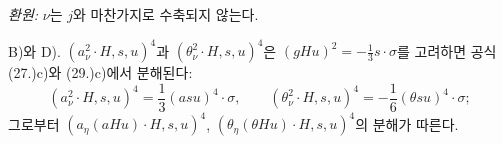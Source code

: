 
\noindent\emph{환원:} $\nu$는 $j$와 마찬가지로 수축되지 않는다.

B)와 D). $(a_\nu^2\cdot H,s,u)^4$과 $(\theta_\nu^2\cdot H,s,u)^4$은 $(gHu)^2=-\frac13s\cdot\sigma$를 고려하면 공식 (27.)c)와 (29.)c)에서 분해된다:
\[
(a_\nu^2\cdot H,s,u)^4=\frac13(asu)^4\cdot\sigma,
\qquad
(\theta_\nu^2\cdot H,s,u)^4=-\frac16(\theta su)^4\cdot\sigma;
\]
그로부터 $(a_\eta(aHu)\cdot H,s,u)^4$, $(\theta_\eta(\theta Hu)\cdot H,s,u)^4$의 분해가 따른다.
